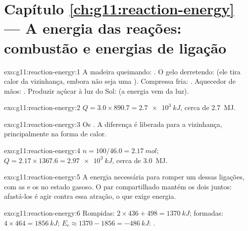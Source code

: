 \section*{Capítulo \ref{ch:g11:reaction-energy} --- A energia das reações: combustão e energias de ligação}

\begin{solution}{exo:g11:reaction-energy:1}
A madeira queimando: . O gelo derretendo:  (ele
tira calor da vizinhança, embora não seja uma ). Compressa
fria: . Aquecedor de mãos: . Produzir açúcar à luz
do Sol:  (a energia vem da luz).
\end{solution}

\begin{solution}{exo:g11:reaction-energy:2}
$Q = 3.0 \times 890.7 = \qty{2.7e3}{kJ}$, cerca de \qty{2.7}{MJ}.
\end{solution}

\begin{solution}{exo:g11:reaction-energy:3}
Os . A diferença é liberada para a vizinhança, principalmente
na forma de calor.
\end{solution}

\begin{solution}{exo:g11:reaction-energy:4}
$n = 100 / 46.0 = \qty{2.17}{mol}$; $Q = 2.17 \times 1367.6 =
\qty{2.97e3}{kJ}$, cerca de \qty{3.0}{MJ}.
\end{solution}

\begin{solution}{exo:g11:reaction-energy:5}
A energia necessária para romper um  dessas ligações, com as
 e os  no estado gasoso. O par compartilhado mantém os
dois  juntos: afastá-los é agir contra essa atração, o que exige
energia.
\end{solution}

\begin{solution}{exo:g11:reaction-energy:6}
Rompidas: $2 \times 436 + 498 = \qty{1370}{kJ}$; formadas:
$4 \times 464 = \qty{1856}{kJ}$; $E_r \approx 1370 - 1856 =
\qty{-486}{kJ}$: .
\end{solution}

